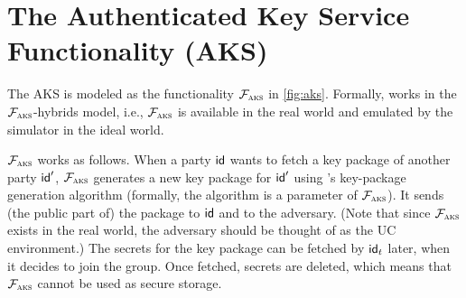 \section{The Authenticated Key Service Functionality (AKS)}\label{sec:pki}


The AKS is modeled as the functionality $\mathcal{F}_{\normalfont\textsc{aks}}$ in \cref{fig:aks}. Formally, \saik
  works in the $\mathcal{F}_{\normalfont\textsc{aks}}$-hybrids model, i.e., $\mathcal{F}_{\normalfont\textsc{aks}}$ is available in the real world and emulated by the simulator in the ideal world.

$\mathcal{F}_{\normalfont\textsc{aks}}$ works as follows. When a party ${\mathsf{id}}$ wants to fetch a key package of another party ${\mathsf{id}}'$, $\mathcal{F}_{\normalfont\textsc{aks}}$ generates a new key package for ${\mathsf{id}}'$ using \saik's key-package generation algorithm (formally, the algorithm is a parameter of $\mathcal{F}_{\normalfont\textsc{aks}}$). It sends (the public part of) the package to ${\mathsf{id}}$ and to the adversary. (Note that since $\mathcal{F}_{\normalfont\textsc{aks}}$ exists in the real world, the adversary should be thought of as the UC environment.) The secrets for the key package can be fetched by ${\mathsf{id}}_t$ later, when it decides to join the group. Once fetched, secrets are deleted, which means that $\mathcal{F}_{\normalfont\textsc{aks}}$ cannot be used as secure storage.